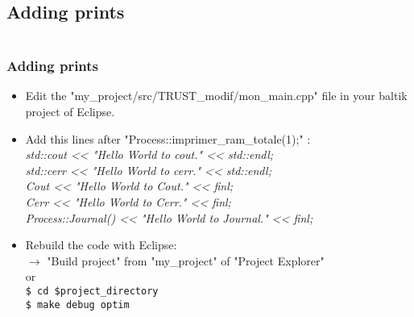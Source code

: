 \documentclass[10pt, hyperref={unicode=true,pdfusetitle, bookmarks=true,bookmarksnumbered=false,bookmarksopen=false, breaklinks=false,pdfborder={0 0 1},backref=true,colorlinks=true,linkcolor=darkblue,pageanchor, urlcolor=darkblue}]{beamer}
\begin{document}
\subsection{{\bf{Adding prints}}}
\begin{frame}
\begin{columns}[c] 
\tableofcontents[sections={1-3},currentsection, currentsubsection]
\tableofcontents[sections={4-8},currentsection, currentsubsection]
\end{columns}
\end{frame}
\begin{frame}
\frametitle{Adding prints}
\begin{block}{}

\begin{itemize}
\item Edit the "my\_project/src/TRUST\_modif/mon\_main.cpp" file in your baltik project of Eclipse.

\item Add this lines after "Process::imprimer\_ram\_totale(1);" :\\
\textit{std::cout <\textcompwordmark{}< "Hello World to cout." <\textcompwordmark{}< std::endl;\\
std::cerr <\textcompwordmark{}< "Hello World to cerr." <\textcompwordmark{}< std::endl;\\
Cout <\textcompwordmark{}< "Hello World to Cout." <\textcompwordmark{}< finl;\\
Cerr <\textcompwordmark{}< "Hello World to Cerr." <\textcompwordmark{}< finl;\\
Process::Journal() <\textcompwordmark{}< "Hello World to Journal." <\textcompwordmark{}< finl;}\\

\item Rebuild the code with Eclipse:\\
$\rightarrow$ "Build project" from "my\_project" of "Project Explorer"\\
or \\
\texttt{\$ cd \$project\_directory}\\
\texttt{\$ make debug optim}\\
\end{itemize}

\end{block}
\end{frame}
\end{document}
